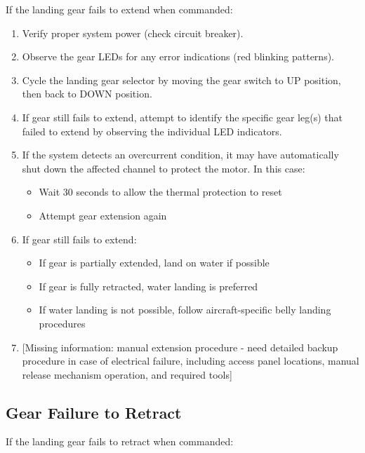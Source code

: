 \documentclass[12pt,a4paper,twoside,openright]{book}
\begin{document}
If the landing gear fails to extend when commanded:

\begin{enumerate}
    \item Verify proper system power (check circuit breaker).
    \item Observe the gear LEDs for any error indications (red blinking patterns).
    \item Cycle the landing gear selector by moving the gear switch to UP position, then back to DOWN position.
    \item If gear still fails to extend, attempt to identify the specific gear leg(s) that failed to extend by observing the individual LED indicators.
    \item If the system detects an overcurrent condition, it may have automatically shut down the affected channel to protect the motor. In this case:
    \begin{itemize}
        \item Wait 30 seconds to allow the thermal protection to reset
        \item Attempt gear extension again
    \end{itemize}
    \item If gear still fails to extend:
    \begin{itemize}
        \item If gear is partially extended, land on water if possible
        \item If gear is fully retracted, water landing is preferred
        \item If water landing is not possible, follow aircraft-specific belly landing procedures
    \end{itemize}
    \item {\color{red}[Missing information: manual extension procedure - need detailed backup procedure in case of electrical failure, including access panel locations, manual release mechanism operation, and required tools]}
\end{enumerate}

\subsection{Gear Failure to Retract}

If the landing gear fails to retract when commanded:
\end{document}
